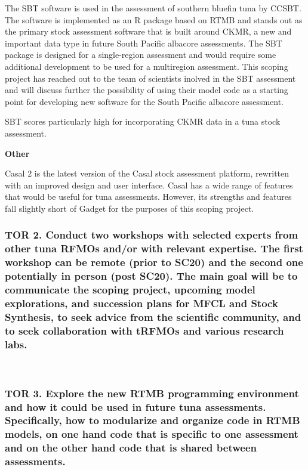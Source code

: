 \documentclass{SCreport}
\begin{document}
\vspace{-0.5ex}

The SBT software is used in the assessment of southern bluefin tuna by CCSBT.
The software is implemented as an R package based on RTMB and stands out as the
primary stock assessment software that is built around CKMR, a new and important
data type in future South Pacific albacore assessments. The SBT package is
designed for a single-region assessment and would require some additional
development to be used for a multiregion assessment. This scoping project has
reached out to the team of scientists inolved in the SBT assessment and will
discuss further the possibility of using their model code as a starting point
for developing new software for the South Pacific albacore assessment.

SBT scores particularly high for incorporating CKMR data in a tuna stock
assessment.

\vspace{1ex}

\textbf{Other}

\vspace{-0.5ex}

Casal 2 is the latest version of the Casal stock assessment platform, rewritten
with an improved design and user interface. Casal has a wide range of features
that would be useful for tuna assessments. However, its strengths and features
fall slightly short of Gadget for the purposes of this scoping project.

\subsubsection{TOR 2. Conduct two workshops with selected experts from other
  tuna RFMOs and/or with relevant expertise. The first workshop can be remote
  (prior to SC20) and the second one potentially in person (post SC20). The main
  goal will be to communicate the scoping project, upcoming model explorations,
  and succession plans for MFCL and Stock Synthesis, to seek advice from the
  scientific community, and to seek collaboration with tRFMOs and various
  research labs.}

~

\subsubsection{TOR 3. Explore the new RTMB programming environment and how it
  could be used in future tuna assessments. Specifically, how to modularize and
  organize code in RTMB models, on one hand code that is specific to one
  assessment and on the other hand code that is shared between assessments.}
\end{document}
